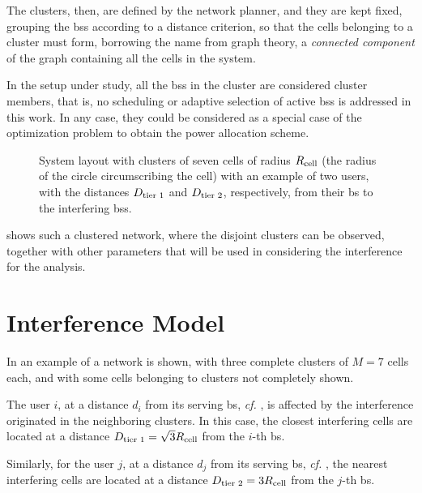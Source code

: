 The clusters, then, are defined by the network planner, and they are kept fixed,
grouping the \glspl{bs} according to a distance criterion, so that the cells
belonging to a cluster must form, borrowing the name from graph theory, a
\emph{connected component} of the graph containing all the cells in the system.

In the setup under study, all the \glspl{bs} in the cluster are considered
cluster members, that is, no scheduling or adaptive selection of active
\glspl{bs} is addressed in this work. In any case, they could be considered as a
special case of the optimization problem to obtain the power allocation scheme.

\begin{figure}[t]
\begin{center}
     \dummybox
\end{center}
\caption{System layout with clusters of seven cells of radius $R_{\text{cell}}$ (the
radius of the circle circumscribing the cell) with an example of two users,
with the distances $D_{\text{tier 1}}$ and $D_{\text{tier 2}}$, respectively, from their \gls{bs} to
the interfering \glspl{bs}.}
\label{fig:achiev_cluster_layout}
\end{figure}

 shows such a clustered network, where the
disjoint clusters can be observed, together with other parameters that will be
used in considering the interference for the analysis.

\section{Interference Model}\label{sec:achiev_interf}

In  an example of a network is shown, with three
complete clusters of $M=7$ cells each, and with some cells belonging to clusters
not completely shown.

The user $i$, at a distance $d_i$ from its serving \gls{bs}, \emph{cf.}
, is affected by the interference originated in the
neighboring clusters. In this case, the closest interfering cells are located at
a distance $D_{\text{tier 1}} = \sqrt{3} R_{\text{cell}}$ from the $i$-th \gls{bs}.

Similarly, for the user $j$, at a distance $d_j$ from its serving \gls{bs},
\emph{cf.} , the nearest interfering cells are located at
a distance $D_{\text{tier 2}} = 3R_{\text{cell}}$ from the $j$-th \gls{bs}.

